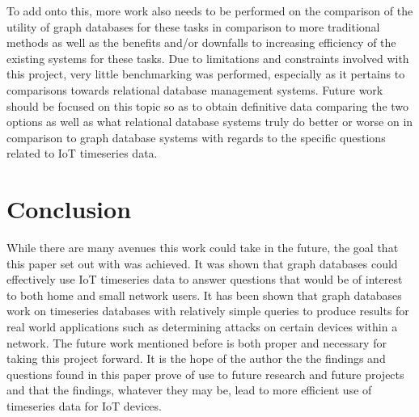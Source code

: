 \documentclass[conference]{IEEEtran}
\begin{document}
To add onto this, more work also needs to be performed on the comparison of the utility of graph databases for these 
tasks in comparison to more traditional methods as well as the benefits and/or downfalls to increasing efficiency of 
the existing systems for these tasks. Due to limitations and constraints involved with this project, very little
benchmarking was performed, especially as it pertains to comparisons towards relational database management systems.
Future work should be focused on this topic so as to obtain definitive data comparing the two options as well as what
relational database systems truly do better or worse on in comparison to graph database systems with regards to
the specific questions related to IoT timeseries data. 

\section{Conclusion}
While there are many avenues this work could take in the future, the goal that this paper set out with was
achieved. It was shown that graph databases could effectively use IoT timeseries data to answer questions
that would be of interest to both home and small network users. It has been shown that graph databases work
on timeseries databases with relatively simple queries to produce results for real world applications such
as determining attacks on certain devices within a network. The future work mentioned before is both proper
and necessary for taking this project forward. It is the hope of the author the the findings and questions
found in this paper prove of use to future research and future projects and that the findings, whatever they
may be, lead to more efficient use of timeseries data for IoT devices.

\printbibliography
\end{document}
